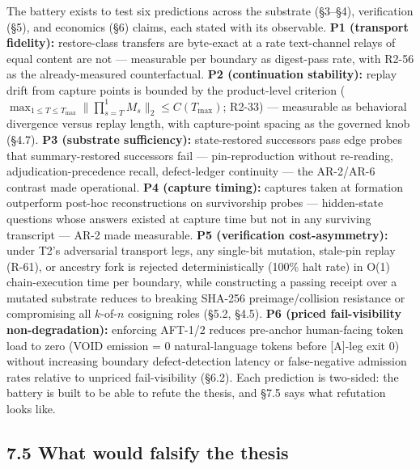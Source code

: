 \documentclass[11pt]{article}
\begin{document}
The battery exists to test six predictions across the substrate (\S{}3--\S{}4), verification (\S{}5), and economics (\S{}6) claims, each stated with its observable. \textbf{P1 (transport fidelity):} restore-class transfers are byte-exact at a rate text-channel relays of equal content are not --- measurable per boundary as digest-pass rate, with R2-56 as the already-measured counterfactual. \textbf{P2 (continuation stability):} replay drift from capture points is bounded by the product-level criterion (\(\max_{1\leq T\leq T_{\max}} \lVert\prod_{s=T}^{1} M_s\rVert_2 \leq C(T_{\max})\); R2-33) --- measurable as behavioral divergence versus replay length, with capture-point spacing as the governed knob (\S{}4.7). \textbf{P3 (substrate sufficiency):} state-restored successors pass edge probes that summary-restored successors fail --- pin-reproduction without re-reading, adjudication-precedence recall, defect-ledger continuity --- the AR-2/AR-6 contrast made operational. \textbf{P4 (capture timing):} captures taken at formation outperform post-hoc reconstructions on survivorship probes --- hidden-state questions whose answers existed at capture time but not in any surviving transcript --- AR-2 made measurable. \textbf{P5 (verification cost-asymmetry):} under T2's adversarial transport legs, any single-bit mutation, stale-pin replay (R-61), or ancestry fork is rejected deterministically (100\% halt rate) in O(1) chain-execution time per boundary, while constructing a passing receipt over a mutated substrate reduces to breaking SHA-256 preimage/collision resistance or compromising all \(k\)-of-\(n\) cosigning roles (\S{}5.2, \S{}4.5). \textbf{P6 (priced fail-visibility non-degradation):} enforcing AFT-1/2 reduces pre-anchor human-facing token load to zero (VOID emission = 0 natural-language tokens before {[}A{]}-leg exit 0) without increasing boundary defect-detection latency or false-negative admission rates relative to unpriced fail-visibility (\S{}6.2). Each prediction is two-sided: the battery is built to be able to refute the thesis, and \S{}7.5 says what refutation looks like.

\subsection{7.5 What would falsify the thesis}\label{what-would-falsify-the-thesis}
\end{document}

